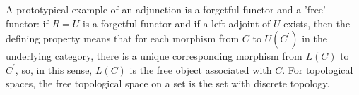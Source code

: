 \begin{center}
    

\end{center}

\begin{example}
A prototypical example of an adjunction is a forgetful functor and a 'free' functor: if $R=U$ is a forgetful functor and if a left adjoint of $U$ exists, then the defining property means that for each morphism from $C$ to $U\left(C^{\prime}\right)$ in the underlying category, there is a unique corresponding morphism from $L(C)$ to $C^{\prime}$, so, in this sense, $L(C)$ is the free object associated with $C$. For topological spaces, the free topological space on a set is the set with discrete topology.
\end{example}

